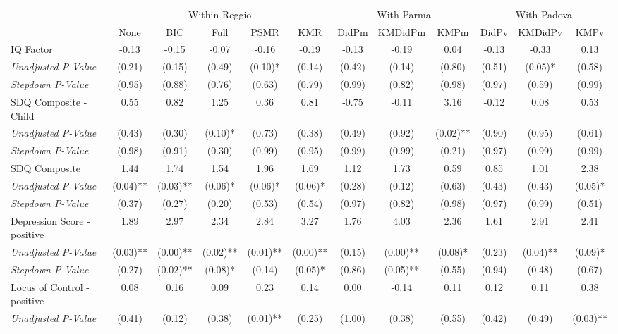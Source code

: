 \begin{tabular}{l c c c c c c c c c c c}
\toprule
& \multicolumn{5}{c}{Within Reggio} & \multicolumn{3}{c}{With Parma} & \multicolumn{3}{c}{With Padova} \\\cmidrule(lr){2-6} \cmidrule(lr){7-9} \cmidrule(lr){10-12}
 & None & BIC & Full & PSMR & KMR & DidPm & KMDidPm & KMPm & DidPv & KMDidPv & KMPv \\
\midrule
IQ Factor & -0.13 & -0.15 & -0.07 & -0.16 & -0.19 & -0.13 & -0.19 & 0.04 & -0.13 & -0.33 & 0.13 \\
\quad \textit{Unadjusted P-Value} & (0.21) & (0.15) & (0.49) & (0.10)* & (0.14) & (0.42) & (0.14) & (0.80) & (0.51) & (0.05)* & (0.58) \\
\quad \textit{Stepdown P-Value} & (0.95) & (0.88) & (0.76) & (0.63) & (0.79) & (0.99) & (0.82) & (0.98) & (0.97) & (0.59) & (0.99) \\
SDQ Composite - Child & 0.55 & 0.82 & 1.25 & 0.36 & 0.81 & -0.75 & -0.11 & 3.16 & -0.12 & 0.08 & 0.53 \\
\quad \textit{Unadjusted P-Value} & (0.43) & (0.30) & (0.10)* & (0.73) & (0.38) & (0.49) & (0.92) & (0.02)** & (0.90) & (0.95) & (0.61) \\
\quad \textit{Stepdown P-Value} & (0.98) & (0.91) & (0.30) & (0.99) & (0.95) & (0.99) & (0.99) & (0.21) & (0.97) & (0.99) & (0.99) \\
SDQ Composite & 1.44 & 1.74 & 1.54 & 1.96 & 1.69 & 1.12 & 1.73 & 0.59 & 0.85 & 1.01 & 2.38 \\
\quad \textit{Unadjusted P-Value} & (0.04)** & (0.03)** & (0.06)* & (0.06)* & (0.06)* & (0.28) & (0.12) & (0.63) & (0.43) & (0.43) & (0.05)* \\
\quad \textit{Stepdown P-Value} & (0.37) & (0.27) & (0.20) & (0.53) & (0.54) & (0.97) & (0.82) & (0.98) & (0.97) & (0.99) & (0.51) \\
Depression Score - positive & 1.89 & 2.97 & 2.34 & 2.84 & 3.27 & 1.76 & 4.03 & 2.36 & 1.61 & 2.91 & 2.41 \\
\quad \textit{Unadjusted P-Value} & (0.03)** & (0.00)** & (0.02)** & (0.01)** & (0.00)** & (0.15) & (0.00)** & (0.08)* & (0.23) & (0.04)** & (0.09)* \\
\quad \textit{Stepdown P-Value} & (0.27) & (0.02)** & (0.08)* & (0.14) & (0.05)* & (0.86) & (0.05)** & (0.55) & (0.94) & (0.48) & (0.67) \\
Locus of Control - positive & 0.08 & 0.16 & 0.09 & 0.23 & 0.14 & 0.00 & -0.14 & 0.11 & 0.12 & 0.11 & 0.38 \\
\quad \textit{Unadjusted P-Value} & (0.41) & (0.12) & (0.38) & (0.01)** & (0.25) & (1.00) & (0.38) & (0.55) & (0.42) & (0.49) & (0.03)** \\

\end{tabular}
